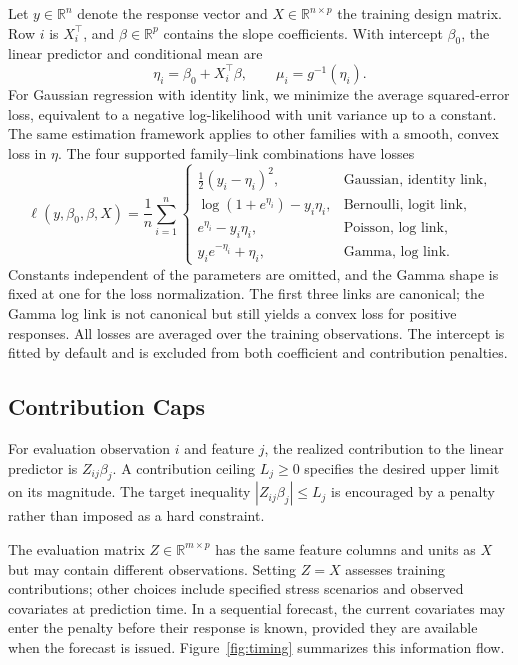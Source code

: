\documentclass[article,shortnames,nofooter]{jss}
\begin{document}
Let $y\in\mathbb{R}^n$ denote the response vector and $X\in\mathbb{R}^{n\times p}$ the training design matrix. Row $i$ is $X_i^\top$, and $\beta\in\mathbb{R}^p$ contains the slope coefficients. With intercept $\beta_0$, the linear predictor and conditional mean are
\begin{equation}
\eta_i=\beta_0+X_i^\top\beta,\qquad \mu_i=g^{-1}(\eta_i).
\label{eq:predictor}
\end{equation}
For Gaussian regression with identity link, we minimize the average squared-error loss, equivalent to a negative log-likelihood with unit variance up to a constant. The same estimation framework applies to other families with a smooth, convex loss in $\eta$. The four supported family--link combinations have losses
\begin{equation}
\ell(y,\beta_0,\beta,X)=\frac{1}{n}\sum_{i=1}^n
\begin{cases}
\tfrac12(y_i-\eta_i)^2, & \text{Gaussian, identity link},\\
\log(1+e^{\eta_i})-y_i\eta_i, & \text{Bernoulli, logit link},\\
e^{\eta_i}-y_i\eta_i, & \text{Poisson, log link},\\
y_i e^{-\eta_i}+\eta_i, & \text{Gamma, log link}.
\end{cases}
\label{eq:likelihood}
\end{equation}
Constants independent of the parameters are omitted, and the Gamma shape is fixed at one for the loss normalization. The first three links are canonical; the Gamma log link is not canonical but still yields a convex loss for positive responses. All losses are averaged over the training observations. The intercept is fitted by default and is excluded from both coefficient and contribution penalties.

\subsection{Contribution Caps}

For evaluation observation $i$ and feature $j$, the realized contribution to the linear predictor is $Z_{ij}\beta_j$. A contribution ceiling $L_j\geq0$ specifies the desired upper limit on its magnitude. The target inequality $|Z_{ij}\beta_j|\leq L_j$ is encouraged by a penalty rather than imposed as a hard constraint.

The evaluation matrix $Z\in\mathbb{R}^{m\times p}$ has the same feature columns and units as $X$ but may contain different observations. Setting $Z=X$ assesses training contributions; other choices include specified stress scenarios and observed covariates at prediction time. In a sequential forecast, the current covariates may enter the penalty before their response is known, provided they are available when the forecast is issued. Figure~\ref{fig:timing} summarizes this information flow.
\end{document}
